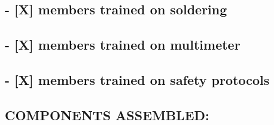 \documentclass[11pt,letterpaper]{article}
\begin{document}
\subsection*{- [X] members trained on soldering}

\subsection*{- [X] members trained on multimeter}

\subsection*{- [X] members trained on safety protocols}

\subsection*{COMPONENTS ASSEMBLED:}
\end{document}
